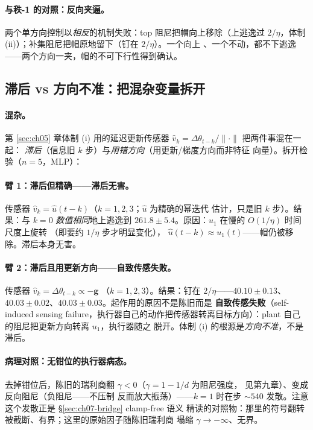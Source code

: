 \paragraph{与秩-1 的对照：反向夹逼。}
两个单方向控制以\emph{相反}的机制失败：top 阻尼把帽向上移除（上逃逸过
$2/\eta$，体制 (ii)）；补集阻尼把帽原地留下（钉在 $2/\eta$）。一个向上
、一个不动，都不下逃逸——两个方向一夹，帽的不可下行性得到确认。

\subsection{滞后 vs 方向不准：把混杂变量拆开}
\label{sec:ch07-lag}

\paragraph{混杂。}
第 \ref{sec:ch05} 章体制 (i) 用的延迟更新传感器
$\hat v_{k}=\Delta\theta_{t-k}/\|\cdot\|$ 把两件事混在一起：
\emph{滞后}（信息旧 $k$ 步）与\emph{用错方向}（用更新/梯度方向而非特征
向量）。拆开检验（$n{=}5$，MLP）：

\paragraph{臂 1：滞后但精确——滞后无害。}
传感器 $\hat v_{k}=\hat u(t-k)$（$k{=}1,2,3$；$\hat u$ 为精确的幂迭代
估计，只是旧 $k$ 步）。结果：与 $k{=}0$ \emph{数值相同}地上逃逸到
$261.8\pm5.4$。原因：$u_{1}$ 在慢的 $O(1/\eta)$ 时间尺度上旋转
（即要约 $1/\eta$ 步才明显变化），
$\hat u(t-k)\approx u_{1}(t)$——帽仍被移除。滞后本身无害。

\paragraph{臂 2：滞后且用更新方向——自致传感失败。}
传感器 $\hat v_{k}=\Delta\theta_{t-k}\propto-\mathbf{g}$
（$k{=}1,2,3$）。结果：钉在 $2/\eta$——$40.10\pm0.13$、
$40.03\pm0.02$、$40.03\pm0.03$。起作用的原因不是陈旧而是
\textbf{自致传感失败}（self-induced sensing failure，执行器自己的动作把传感器转离目标方向）：plant 自己的阻尼把更新方向转离 $u_{1}$，执行器随之
脱开。体制 (i) 的根源是\emph{方向不准}，不是滞后。

\paragraph{病理对照：无钳位的执行器病态。}
去掉钳位后，陈旧的瑞利商翻 $\gamma<0$（$\gamma=1-1/d$ 为阻尼强度，
见第九章）、变成反向阻尼（负阻尼——不压制
反而放大振荡）——$k{=}1$ 时在步
$\sim540$ 发散。注意这个发散正是 §\ref{sec:ch07-bridge} clamp-free 语义
精读的对照物：那里的符号翻转被截断、有界；这里的原始因子随陈旧瑞利商
塌缩 $\gamma\to-\infty$、无界。


